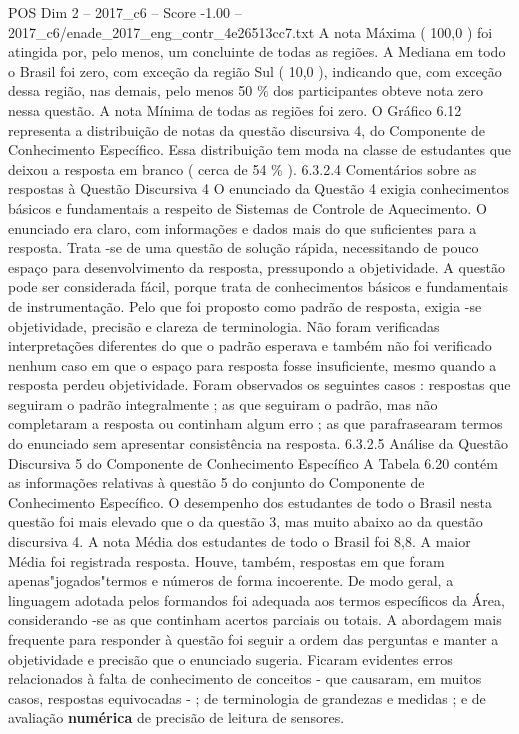 \begin{textsample}{POS Dim 2 – 2017\_c6 – Score -1.00 – 2017\_c6/enade\_2017\_eng\_contr\_4e26513cc7.txt}
A nota Máxima ( 100,0 ) foi atingida por, pelo menos, um concluinte de todas as regiões.
A Mediana em todo o Brasil foi zero, com exceção da região Sul ( 10,0 ), indicando que, com exceção dessa região, nas demais, pelo menos 50 \% dos participantes obteve nota zero nessa questão.
A nota Mínima de todas as regiões foi zero.
O Gráfico 6.12 representa a distribuição de notas da questão discursiva 4, do Componente de Conhecimento Específico.
Essa distribuição tem moda na classe de estudantes que deixou a resposta em branco ( cerca de 54 \% ). 6.3.2.4 Comentários sobre as respostas à Questão Discursiva 4 O enunciado da Questão 4 exigia conhecimentos básicos e fundamentais a respeito de Sistemas de Controle de Aquecimento.
O enunciado era claro, com informações e dados mais do que suficientes para a resposta.
Trata -se de uma questão de solução rápida, necessitando de pouco espaço para desenvolvimento da resposta, pressupondo a objetividade.
A questão pode ser considerada fácil, porque trata de conhecimentos básicos e fundamentais de instrumentação.
Pelo que foi proposto como padrão de resposta, exigia -se objetividade, precisão e clareza de terminologia.
Não foram verificadas interpretações diferentes do que o padrão esperava e também não foi verificado nenhum caso em que o espaço para resposta fosse insuficiente, mesmo quando a resposta perdeu objetividade.
Foram observados os seguintes casos : respostas que seguiram o padrão integralmente ; as que seguiram o padrão, mas não completaram a resposta ou continham algum erro ; as que parafrasearam termos do enunciado sem apresentar consistência na resposta. 6.3.2.5 Análise da Questão Discursiva 5 do Componente de Conhecimento Específico A Tabela 6.20 contém as informações relativas à questão 5 do conjunto do Componente de Conhecimento Específico.
O desempenho dos estudantes de todo o Brasil nesta questão foi mais elevado que o da questão 3, mas muito abaixo ao da questão discursiva 4.
A nota Média dos estudantes de todo o Brasil foi 8,8.
A maior Média foi registrada resposta.
Houve, também, respostas em que foram apenas"jogados"termos e números de forma incoerente.
De modo geral, a linguagem adotada pelos formandos foi adequada aos termos específicos da Área, considerando -se as que continham acertos parciais ou totais.
A abordagem mais frequente para responder à questão foi seguir a ordem das perguntas e manter a objetividade e precisão que o enunciado sugeria.
Ficaram evidentes erros relacionados à falta de conhecimento de conceitos - que causaram, em muitos casos, respostas equivocadas - ; de terminologia de grandezas e medidas ; e de avaliação \textbf{numérica} de precisão de leitura de sensores.

\end{textsample}
